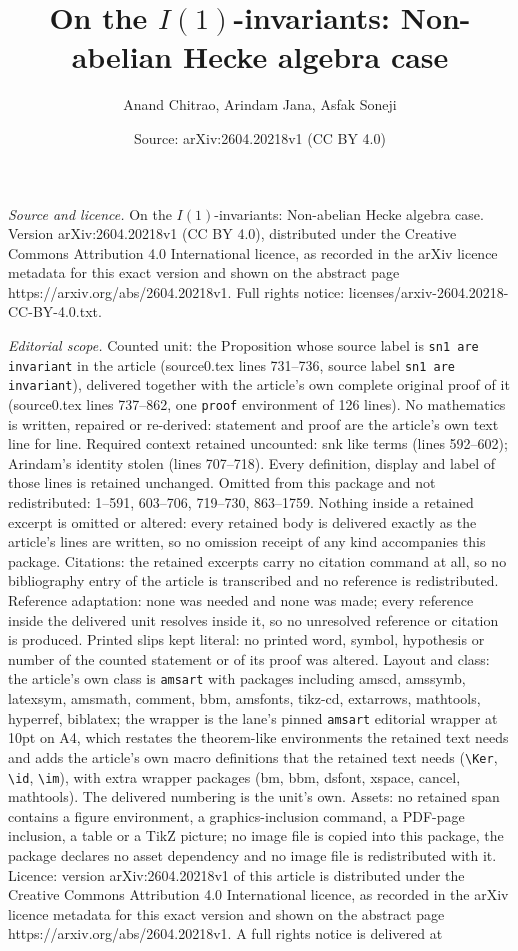 \documentclass[10pt,a4paper]{amsart}
\title[On the $I(1)$-invariants: Non-abelian Hecke algebra case]{On the $I(1)$-invariants: Non-abelian Hecke algebra case}
\author{Anand Chitrao, Arindam Jana, Asfak Soneji}
\date{Source: arXiv:2604.20218v1 (CC BY 4.0)}
\begin{document}
\maketitle

\noindent\emph{Source and licence.} On the $I(1)$-invariants: Non-abelian Hecke algebra case. Version arXiv:2604.20218v1 (CC BY 4.0), distributed under the Creative Commons Attribution 4.0 International licence, as recorded in the arXiv licence metadata for this exact version and shown on the abstract page https://arxiv.org/abs/2604.20218v1. Full rights notice: licenses/arxiv-2604.20218-CC-BY-4.0.txt.\par\smallskip

\noindent\textit{Editorial scope.} Counted unit: the Proposition whose source label is \texttt{sn1 are invariant} in the article (source0.tex lines 731--736, source label \texttt{sn1 are invariant}), delivered together with the article's own complete original proof of it (source0.tex lines 737--862, one \texttt{proof} environment of 126 lines). No mathematics is written, repaired or re-derived: statement and proof are the article's own text line for line. Required context retained uncounted: snk like terms (lines 592--602); Arindam's identity stolen (lines 707--718). Every definition, display and label of those lines is retained unchanged. Omitted from this package and not redistributed: 1--591, 603--706, 719--730, 863--1759. Nothing inside a retained excerpt is omitted or altered: every retained body is delivered exactly as the article's lines are written, so no omission receipt of any kind accompanies this package. Citations: the retained excerpts carry no citation command at all, so no bibliography entry of the article is transcribed and no reference is redistributed. Reference adaptation: none was needed and none was made; every reference inside the delivered unit resolves inside it, so no unresolved reference or citation is produced. Printed slips kept literal: no printed word, symbol, hypothesis or number of the counted statement or of its proof was altered. Layout and class: the article's own class is \texttt{amsart} with packages including amscd, amssymb, latexsym, amsmath, comment, bbm, amsfonts, tikz-cd, extarrows, mathtools, hyperref, biblatex; the wrapper is the lane's pinned \texttt{amsart} editorial wrapper at 10pt on A4, which restates the theorem-like environments the retained text needs and adds the article's own macro definitions that the retained text needs (\texttt{\textbackslash Ker}, \texttt{\textbackslash id}, \texttt{\textbackslash im}), with extra wrapper packages (bm, bbm, dsfont, xspace, cancel, mathtools). The delivered numbering is the unit's own. Assets: no retained span contains a figure environment, a graphics-inclusion command, a PDF-page inclusion, a table or a TikZ picture; no image file is copied into this package, the package declares no asset dependency and no image file is redistributed with it. Licence: version arXiv:2604.20218v1 of this article is distributed under the Creative Commons Attribution 4.0 International licence, as recorded in the arXiv licence metadata for this exact version and shown on the abstract page https://arxiv.org/abs/2604.20218v1. A full rights notice is delivered at 
\end{document}
